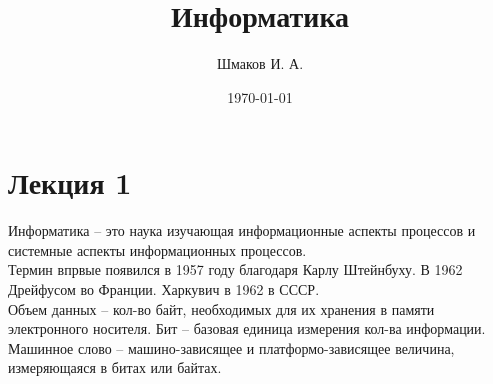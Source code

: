 \documentclass[a4paper, 12pt]{article}
\title{Информатика}
\author{Шмаков И. А.}
\date{\today}
\begin{document}
\sffamily
\maketitle
\section*{Лекция 1}
Информатика -- это наука изучающая информационные аспекты процессов и системные аспекты информационных процессов.\\
Термин впрвые появился в 1957 году благодаря Карлу Штейнбуху. В 1962 Дрейфусом во Франции. Харкувич в 1962 в СССР.\\
Объем данных -- кол-во байт, необходимых для их хранения в памяти электронного носителя. Бит -- базовая единица измерения кол-ва информации.\\
Машинное слово -- машино-зависящее и платформо-зависящее величина, измеряющаяся в битах или байтах.
\end{document}

